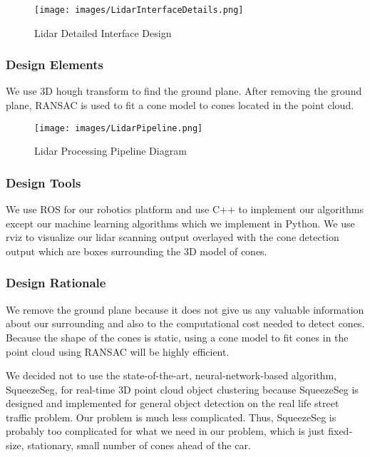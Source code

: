 \documentclass[10pt, onecolumn, draftclsnofoot, letterpaper,compsoc]{IEEEtran}
\begin{document}
\begin{figure}[htbp]
\centering
\label{fig:LidarInterfaceOverview}
\caption{Lidar Detailed Interface Design}
\texttt{[image: images/LidarInterfaceDetails.png]}
\end{figure}

\subsubsection{Design Elements} %
We use 3D hough transform to find the ground plane. After removing the ground plane, RANSAC is used to fit a cone model to cones located in the point cloud.

\begin{figure}[htbp]
\centering
\label{fig:LidarPipeline}
\caption{Lidar Processing Pipeline Diagram}
\texttt{[image: images/LidarPipeline.png]}
\end{figure}


\subsubsection{Design Tools} %
We use ROS for our robotics platform and use C++ to implement our algorithms except our machine learning algorithms which we implement in Python. We use rviz to visualize our lidar scanning output overlayed with the cone detection output which are boxes surrounding the 3D model of cones.

\subsubsection{Design Rationale} %
We remove the ground plane because it does not give us any valuable information about our surrounding and also to the computational cost needed to detect cones. Because the shape of the cones is static, using a cone model to fit cones in the point cloud using RANSAC will be highly efficient.

We decided not to use the state-of-the-art, neural-network-based  algorithm, SqueezeSeg, for real-time 3D point cloud object clustering because SqueezeSeg is designed and implemented for general object detection on the real life street traffic problem. Our problem is much less complicated. Thus, SqueezeSeg is probably too complicated for what we need in our problem, which is just fixed-size, stationary, small number of cones ahead of the car.
\end{document}
